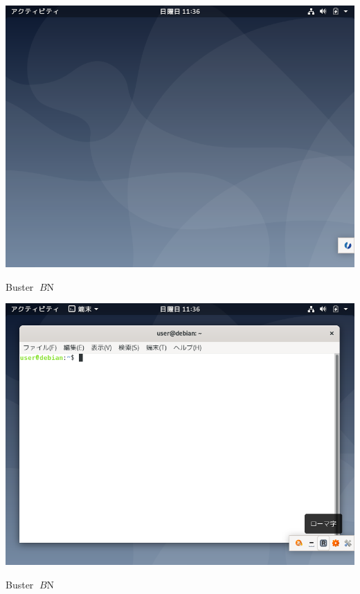 \documentclass[mingoth,a4paper]{jsarticle}
\begin{document}
{{\begin{center}
\includegraphics[keepaspectratio,width=1\hsize]{image201907/buster_gnome_1.png}
\end{center}



Buster $B$N%

\begin{center}
\includegraphics[keepaspectratio,width=1\hsize]{image201907/buster_gnome_2.png}
\end{center}



Buster $B$N%

}}
\end{document}
